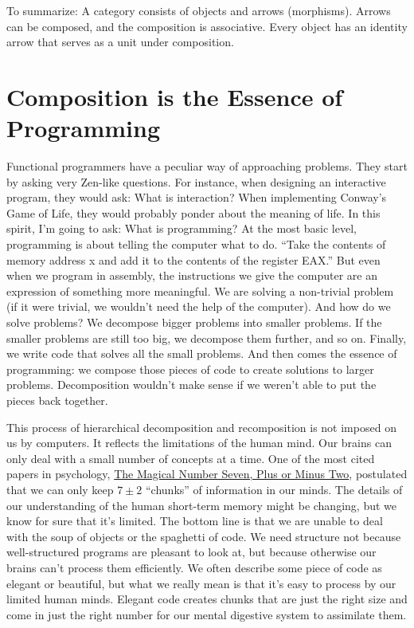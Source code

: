 To summarize: A category consists of objects and arrows (morphisms).
Arrows can be composed, and the composition is associative. Every object
has an identity arrow that serves as a unit under composition.

\section{Composition is the Essence of
Programming}\label{composition-is-the-essence-of-programming}

Functional programmers have a peculiar way of approaching problems. They
start by asking very Zen-like questions. For instance, when designing an
interactive program, they would ask: What is interaction? When
implementing Conway's Game of Life, they would probably ponder about the
meaning of life. In this spirit, I'm going to ask: What is programming?
At the most basic level, programming is about telling the computer what
to do. ``Take the contents of memory address x and add it to the
contents of the register EAX.'' But even when we program in assembly,
the instructions we give the computer are an expression of something
more meaningful. We are solving a non-trivial problem (if it were
trivial, we wouldn't need the help of the computer). And how do we solve
problems? We decompose bigger problems into smaller problems. If the
smaller problems are still too big, we decompose them further, and so
on. Finally, we write code that solves all the small problems. And then
comes the essence of programming: we compose those pieces of code to
create solutions to larger problems. Decomposition wouldn't make sense
if we weren't able to put the pieces back together.

This process of hierarchical decomposition and recomposition is not
imposed on us by computers. It reflects the limitations of the human
mind. Our brains can only deal with a small number of concepts at a
time. One of the most cited papers in psychology,
\href{http://en.wikipedia.org/wiki/The_Magical_Number_Seven,_Plus_or_Minus_Two}{The
Magical Number Seven, Plus or Minus Two}, postulated that we can only
keep \ensuremath{7 \pm 2} ``chunks'' of information in our minds. The details of our
understanding of the human short-term memory might be changing, but we
know for sure that it's limited. The bottom line is that we are unable
to deal with the soup of objects or the spaghetti of code. We need
structure not because well-structured programs are pleasant to look at,
but because otherwise our brains can't process them efficiently. We
often describe some piece of code as elegant or beautiful, but what we
really mean is that it's easy to process by our limited human minds.
Elegant code creates chunks that are just the right size and come in
just the right number for our mental digestive system to assimilate
them.

